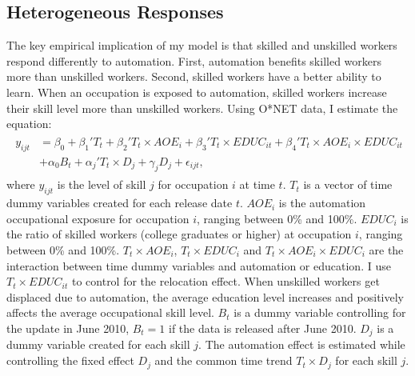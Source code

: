 \documentclass[12pt]{article}
\begin{document}
\subsection{Heterogeneous Responses}
The key empirical implication of my model is that skilled and unskilled workers respond differently to automation. First, automation benefits skilled workers more than unskilled workers. Second, skilled workers have a better ability to learn. When an occupation is exposed to automation, skilled workers increase their skill level more than unskilled workers. Using O*NET data, I estimate the equation: 
\begin{align}
\begin{split}
y_{ijt} &= \beta_0 + \beta_1' T_t +\beta_2' T_t \times AOE_{i}+\beta_3' T_t  \times EDUC_{it} +\beta_4' T_t \times AOE_{i} \times EDUC_{it}\\
         &+\alpha_0 B_t+\alpha_j' T_t \times D_j +\gamma_j D_j +\epsilon_{ijt},
\end{split}
\end{align}
where $y_{ijt}$ is the level of skill $j$ for occupation $i$ at time $t$. $T_t$ is a vector of time dummy variables created for each release date $t$. $AOE_{i}$ is the automation occupational exposure for occupation $i$, ranging between 0\% and 100\%. $EDUC_{i}$ is the ratio of skilled workers (college graduates or higher) at occupation $i$, ranging between 0\% and 100\%. $T_t \times AOE_{i}$, $T_t \times EDUC_{i}$ and $T_t \times AOE_{i}\times EDUC_{i}$ are the interaction between time dummy variables and automation or education. I use  $T_t\times EDUC_{it}$ to control for the relocation effect. When unskilled workers get displaced due to automation, the average education level increases and positively affects the average occupational skill level. $B_t$ is a dummy variable controlling for the update in June 2010, $B_t = 1$ if the data is released after June 2010. $D_j$ is a dummy variable created for each skill $j$. The automation effect is estimated while controlling the fixed effect $D_j$ and the common time trend $T_t \times D_j$ for each skill $j$. 
\end{document}

